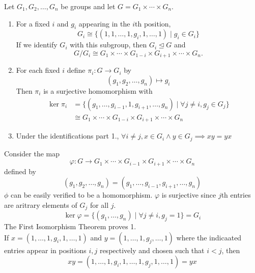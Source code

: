 \documentclass{report}
\newcommand{\mprop}[2]{\begin{Prop}{#1}{}#2\end{Prop}}
\newenvironment{myproof}[1][\proofname]{%
	\proof[\bfseries #1: ]%
}{\endproof}
\begin{document}
\mprop{}{Let $G_1, G_2, \dots, G_n$ be groups and let $G= G_1 \times \cdots \times G_n$.
\begin{enumerate}
    \item For a fixed $i$ and $g_i$ appearing in the $i$th position, 
    $$G_i \cong \{(1, 1, \dots , 1, g_i, 1, \dots, 1) \mid g_i \in G_i\}$$
    If we identify $G_i$ with this subgroup, then $G_i \unlhd G$ and 
    $$G/G_i \cong G_1 \times \cdots \times G_{1-i} \times G_{i +1} \times \cdots \times G_n.$$
    \item For each fixed $i$ define $\pi_i: G \to G_i$ by 
    $$(g_1, g_2, \dots, g_n) \mapsto g_i$$
    Then $\pi_i$ is a surjective homomorphism with 
    \begin{align*}
    \ker \pi_i &= \{(g_1, \dots, g_{i-1}, 1, g_{i+1}, \dots, g_n) \mid \forall j \neq i, g_j \in G_j\} \\
    &\cong G_1 \times \cdots \times G_{1-i} \times G_{i +1} \times \cdots \times G_n
    \end{align*}
    \item Under the identifications part 1., $\forall i \neq j, x \in G_i \land y \in G_j \implies xy= yx$
\end{enumerate}}
\begin{myproof}
    Consider the map $$\varphi: G \to G_1 \times \cdots \times G_{i-1} \times G_{i+1} \times \cdots \times G_n$$
    defined by 
    $$(g_1, g_2, \dots, g_n) = (g_1, \dots, g_{i-1}, g_{i+1}, \dots, g_n)$$
    $\phi$ can be easily verified to be a homomorphism. $\varphi$ is surjective since $j$th entries are aritrary elements of $G_j$ for all $j$. 
    $$\ker \varphi = \{(g_1, \dots, g_n) \mid \forall j \neq i, g_j = 1\} = G_i$$
    The First Isomorphism Theorem proves 1. \\
    If $x = (1, \dots, 1, g_i, 1, \dots, 1)$ and $y = (1, \dots, 1, g_j, \dots, 1)$ where the indicaated entries appear in positions $i, j$ respectively and chosen such that $i<j$, then 
    $$xy = (1, \dots, 1, g_i, 1, \dots, 1, g_j, 1, \dots, 1) = yx$$
\end{myproof}
\end{document}
